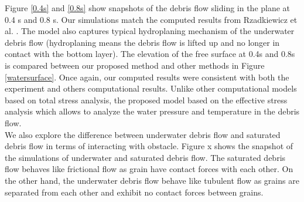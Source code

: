 \documentclass[preprint,12pt]{elsarticle}
\begin{document}
%
%
Figure \ref{0.4s} and  \ref{0.8s} show snapshots of the debris flow sliding in the plane at 0.4 s and 0.8 s. Our simulations match the computed results from Rzadkiewicz et al. \cite{Rzadkiewicz}. The model also captures typical hydroplaning mechanism of the underwater debris flow (hydroplaning means the debris flow is lifted up and no longer in contact with the bottom layer). The elevation of the free surface at 0.4s and 0.8s is compared between our proposed method and other methods in Figure \ref{watersurface}. Once again, our computed results were consistent with both the experiment and others computational results. Unlike other computational models based on total stress analysis, the proposed model based on the effective stress analysis which allows to analyze the water pressure  and temperature in the debris flow.  \\
We also explore the difference between underwater debris flow and saturated debris flow in terms of interacting with obstacle. Figure x shows the snapshot of the simulations of underwater and saturated debris flow. The saturated debris flow behaves like frictional flow as grain have contact forces with each other. On the other hand, the underwater debris flow behave like tubulent flow as grains are separated from each other and exhibit no contact forces between grains.  \\
\end{document}

